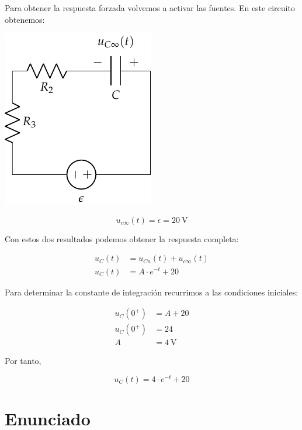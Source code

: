 Para obtener la respuesta forzada volvemos a activar las fuentes. En
este circuito obtenemos:

\begin{minipage}{0.3\textwidth}
  \includegraphics{figuras/FM_4_3_forzada}
\end{minipage}
\begin{minipage}{0.7\textwidth}
  \begin{equation*}
    u_{c\infty}(t) = \epsilon = \SI{20}{\volt}
  \end{equation*}
\end{minipage}

Con estos dos resultados podemos obtener la respuesta completa:

\begin{align*}
  u_C(t) &= u_{Cn}(t) + u_{c\infty}(t)\\
  u_C(t) &= A \cdot e^{-t} + 20
\end{align*}

Para determinar la constante de integración recurrimos a las
condiciones iniciales:

\begin{align*}
  u_C(0^+) &= A + 20\\
  u_C(0^+) &= 24\\
  A &= \SI{4}{\volt}
\end{align*}

Por tanto,

\begin{equation*}
  u_C(t) = 4 \cdot e^{-t} + 20
\end{equation*}

\section{Enunciado}

